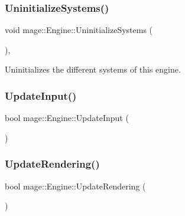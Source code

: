 \subsubsection{\texorpdfstring{Uninitialize\+Systems()}{UninitializeSystems()}}
{\footnotesize\ttfamily void mage\+::\+Engine\+::\+Uninitialize\+Systems (\begin{DoxyParamCaption}{ }\end{DoxyParamCaption})\hspace{0.3cm}{\ttfamily [private]}, {\ttfamily [noexcept]}}

Uninitializes the different systems of this engine. \hypertarget{classmage_1_1_engine_ad35eef077bc695803769a385e2751cbe}{}\label{classmage_1_1_engine_ad35eef077bc695803769a385e2751cbe} 
\subsubsection{\texorpdfstring{Update\+Input()}{UpdateInput()}}
{\footnotesize\ttfamily bool mage\+::\+Engine\+::\+Update\+Input (\begin{DoxyParamCaption}{ }\end{DoxyParamCaption})\hspace{0.3cm}{\ttfamily [private]}}

\hypertarget{classmage_1_1_engine_a5a39d76019d51290a5ba305c57384fae}{}\label{classmage_1_1_engine_a5a39d76019d51290a5ba305c57384fae} 
\subsubsection{\texorpdfstring{Update\+Rendering()}{UpdateRendering()}}
{\footnotesize\ttfamily bool mage\+::\+Engine\+::\+Update\+Rendering (\begin{DoxyParamCaption}{ }\end{DoxyParamCaption})\hspace{0.3cm}{\ttfamily [private]}}

\hypertarget{classmage_1_1_engine_a3c7a55a89a23952a368432f933a90d26}{}\label{classmage_1_1_engine_a3c7a55a89a23952a368432f933a90d26} 
